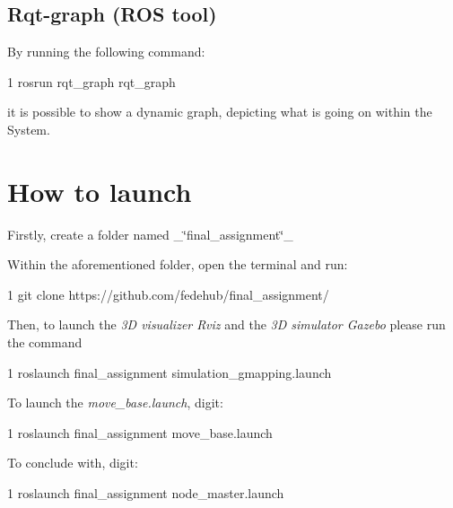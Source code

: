 \subsection*{Rqt-\/graph (R\+OS tool)}

By running the following command\+:


\begin{DoxyCode}
1 rosrun rqt\_graph rqt\_graph
\end{DoxyCode}
 it is possible to show a dynamic graph, depicting what is going on within the System.



\section*{How to launch}


\begin{DoxyEnumerate}
\item Firstly, create a folder named \+\_\+\char`\"{}final\+\_\+assignment\char`\"{}\+\_\+
\item Within the aforementioned folder, open the terminal and run\+:
\end{DoxyEnumerate}


\begin{DoxyCode}
1 git clone https://github.com/fedehub/final\_assignment/
\end{DoxyCode}

\begin{DoxyEnumerate}
\item Then, to launch the {\itshape 3D visualizer Rviz} and the {\itshape 3D simulator Gazebo} please run the command 
\begin{DoxyCode}
1 roslaunch final\_assignment simulation\_gmapping.launch
\end{DoxyCode}

\item To launch the {\itshape move\+\_\+base.\+launch}, digit\+:
\end{DoxyEnumerate}


\begin{DoxyCode}
1 roslaunch final\_assignment move\_base.launch
\end{DoxyCode}

\begin{DoxyEnumerate}
\item To conclude with, digit\+:
\end{DoxyEnumerate}


\begin{DoxyCode}
1 roslaunch final\_assignment node\_master.launch
\end{DoxyCode}



